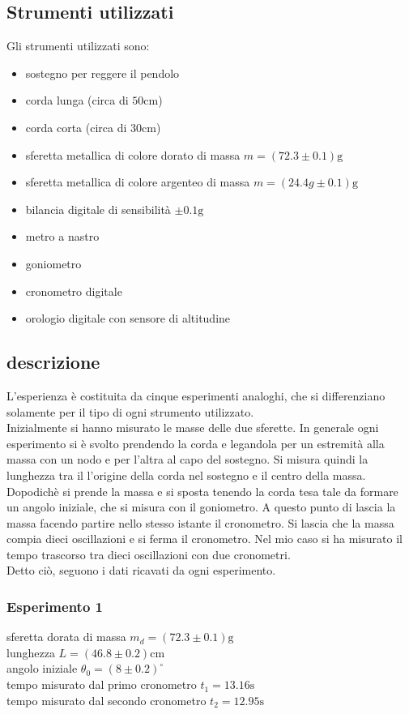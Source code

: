 \documentclass{article}
\begin{document}
\subsection{Strumenti utilizzati}
Gli strumenti utilizzati sono:
\begin{itemize}
	\item sostegno per reggere il pendolo
	\item corda lunga (circa di $50 \mathrm{cm}$)
	\item corda corta (circa di $30 \mathrm{cm}$)
	\item sferetta metallica di colore dorato di massa $m = (72.3 \pm 0.1) \mathrm{g}$
	\item sferetta metallica di colore argenteo di massa $m = (24.4g \pm 0.1) \mathrm{g}$
	\item bilancia digitale di sensibilità $\pm 0.1 \mathrm{g}$
	\item metro a nastro
	\item goniometro
	\item cronometro digitale
	\item orologio digitale con sensore di altitudine
\end{itemize}
\subsection{descrizione}
L'esperienza è costituita da cinque esperimenti analoghi, che si differenziano solamente per il tipo di ogni strumento utilizzato. \\
Inizialmente si hanno misurato le masse delle due sferette.
In generale ogni esperimento si è svolto prendendo la corda e legandola per un estremità alla massa con un nodo e per l'altra al capo del sostegno. Si misura quindi la lunghezza tra il l'origine della corda nel sostegno e il centro della massa. Dopodichè si prende la massa e si sposta tenendo la corda tesa tale da formare un angolo iniziale, che si misura con il goniometro. A questo punto di lascia la massa facendo partire nello stesso istante il cronometro. Si lascia che la massa compia dieci oscillazioni e si ferma il cronometro. Nel mio caso si ha misurato il tempo trascorso tra dieci oscillazioni con due cronometri.\\
Detto ciò, seguono i dati ricavati da ogni esperimento.

\subsubsection{Esperimento 1}
sferetta dorata di massa $m_d = (72.3 \pm 0.1) \mathrm{g}$\\
lunghezza $L = (46.8 \pm 0.2) \mathrm{cm}$\\
angolo iniziale $\theta_0 = (8 \pm  0.2)^{\circ}$\\
tempo misurato dal primo cronometro $t_1 = 13.16 \mathrm{s}$\\
tempo misurato dal secondo cronometro $t_2 = 12.95 \mathrm{s}$
\end{document}

